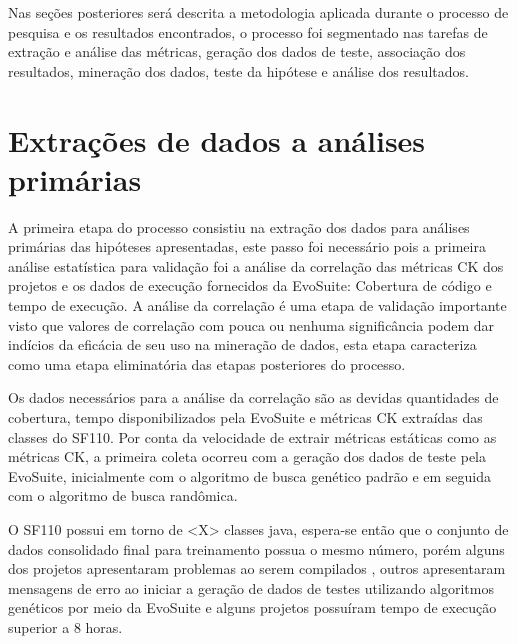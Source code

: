 \documentclass[
	12pt,				%
	oneside,			%
	a4paper,			%
	english,			%
	brazil				%
	]{abntex2ppgsi}
\begin{document}
Nas seções posteriores será descrita a metodologia aplicada durante o processo de pesquisa e os resultados encontrados, o processo foi segmentado nas tarefas de extração e análise das métricas, geração dos dados de teste, associação dos resultados, mineração dos dados, teste da hipótese e análise dos resultados.
 
  \section{Extrações de dados a análises primárias}
  A primeira etapa do processo consistiu na  extração dos dados para análises primárias das hipóteses apresentadas, este passo foi necessário pois a primeira análise estatística  para validação foi a análise da correlação das métricas CK dos projetos e os dados de execução fornecidos da EvoSuite: Cobertura de código e tempo de execução. A análise da correlação é uma etapa de validação importante visto que valores de correlação com pouca ou nenhuma significância podem dar indícios da eficácia de seu uso na mineração de dados, esta etapa caracteriza como uma etapa eliminatória das etapas posteriores do processo. 
  
 Os dados necessários para a análise da correlação são as devidas quantidades de cobertura, tempo disponibilizados pela EvoSuite e métricas CK extraídas das classes do SF110. Por conta da velocidade de extrair métricas estáticas como as métricas CK, a primeira coleta ocorreu com a geração dos dados de teste pela EvoSuite, inicialmente com o algoritmo de busca genético padrão e em seguida com o algoritmo de busca randômica.
 
 O SF110 possui em torno de <X> classes java, espera-se então que o conjunto de dados consolidado final para treinamento possua o mesmo número, porém alguns dos projetos apresentaram problemas ao serem compilados , outros apresentaram mensagens de erro ao iniciar a geração de dados de testes utilizando algoritmos genéticos por meio da EvoSuite e alguns projetos possuíram tempo de execução superior a 8 horas.
\end{document}
